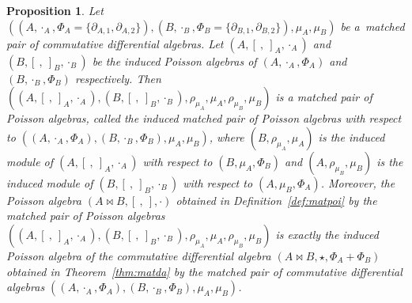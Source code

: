 \documentclass[10pt,a4paper]{amsart}
\numberwithin{equation}{section}
\newtheorem{Proposition}[Theorem]{Proposition}
{ \theoremstyle{definition}
	\newtheorem{Definition}[Theorem]{Definition}
	\newtheorem{Note}[Theorem]{Note}
	\newtheorem{Example}[Theorem]{Example}
	\newtheorem{Remark}[Theorem]{Remark} }
\begin{document}
\begin{Proposition}\label{pro:assmat}
 Let $((A, \cdot_A, \Phi_A = \{\partial_{A, 1}, \partial_{A, 2}\}), (B, \cdot_B, \Phi_B= \{\partial_{B,1},\partial_{B,2}\}), \mu_A,\mu_B)$ be a~mat\-ched pair of commutative differential algebras.
 Let $(A, [\ ,\ ]_A, \cdot_A)$ and $(B, [\ ,\ ]_B, \cdot_B)$ be the induced Poisson algebras of $(A, \cdot_A, \Phi_A)$ and $(B, \cdot_B, \Phi_B)$ respectively.
 Then $((A, [\ ,\ ]_A, \cdot_A), (B, [\ ,\ ]_B, \cdot_B), \allowbreak \rho_{\mu_A}, \mu_A, \rho_{\mu_B}, \mu_B)$ is a matched pair of Poisson algebras,
 called the induced matched pair of Poisson algebras with respect to $((A, \cdot_A, \Phi_A), (B, \cdot_B, \Phi_B),\mu_A,\mu_B)$,
 where $(B, \rho_{\mu_A}, \mu_A)$ is the induced module of $(A, [\ ,\ ]_A, \cdot_A)$ with respect to $(B, \mu_A,\Phi_B)$ and
 $(A, \rho_{\mu_B}, \mu_B)$ is the induced module of $(B, [\ ,\ ]_B, \cdot_B)$ with respect to $(A, \mu_B, \Phi_A)$.
 Moreover, the Poisson algebra $(A \bowtie B, [\ ,\ ], \cdot)$ obtained in Definition~{\rm \ref{def:matpoi}} by the matched pair of Poisson algebras
 $((A, [\ ,\ ]_A, \cdot_A), (B, [\ ,\ ]_B, \cdot_B), \rho_{\mu_A}, \mu_A,\allowbreak \rho_{\mu_B}, \mu_B)$ is exactly
 the induced Poisson algebra of the commutative differential algebra $(A \bowtie B,\allowbreak \star, \Phi_A + \Phi_B)$ obtained in Theorem~{\rm \ref{thm:matda}} by the matched pair of commutative differential algebras $((A, \cdot_A, \Phi_A), (B, \cdot_B, \Phi_B), \mu_A, \mu_B)$.
\end{Proposition}
\end{document}
